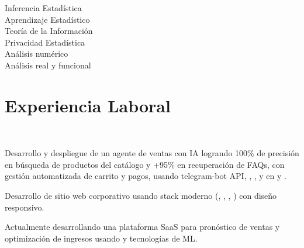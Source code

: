 \documentclass[]{tex/deedy-resume-openfont}
\begin{document}
\begin{minipage}[t]{0.32\textwidth}
\sectionsep

Inferencia Estadística\\
Aprendizaje Estadístico\\
Teoría de la Información\\
Privacidad Estadística\\
Análisis numérico \\
Análisis real y funcional\\

%
%

\end{minipage} 
\hfill
\begin{minipage}[t]{0.66\textwidth} 


\section{Experiencia Laboral}

\\
\vspace{\topsep}
\begin{tightemize}
    \item Desarrollo y despliegue de un agente de ventas con IA logrando 100\% de precisión en búsqueda de productos del catálogo y +95\% en recuperación de FAQs, con gestión automatizada de carrito y pagos, usando telegram-bot API, , ,  y  en  y .
    \item Desarrollo de sitio web corporativo usando stack moderno (, , , ) con diseño responsivo.
    \item Actualmente desarrollando una plataforma SaaS para pronóstico de ventas y optimización de ingresos usando  y tecnologías de ML.
\end{tightemize}
\sectionsep


\end{minipage}
\end{document}
